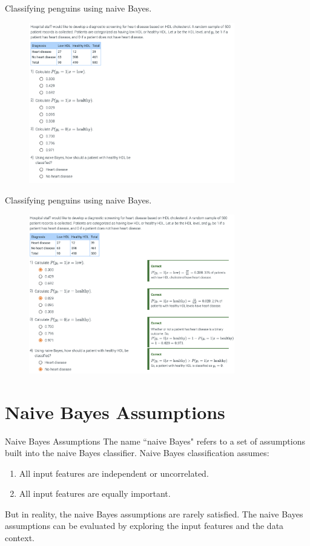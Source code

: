 \documentclass[10pt,dvipsnames]{beamer}
\begin{document}
\begin{frame}{Classifying penguins using naive Bayes.}
	\begin{figure}[ht]
		\centering
		\includegraphics[width=0.8\textwidth]{imgs/nb_14.png}
	\end{figure}
\end{frame}

\begin{frame}{Classifying penguins using naive Bayes.}
	\begin{figure}[ht]
		\centering
		\includegraphics[width=0.8\textwidth]{imgs/nb_15.png}
	\end{figure}
\end{frame}

\section{Naive Bayes Assumptions}
\begin{frame}{Naive Bayes Assumptions}
The name ``naive Bayes" refers to a set of assumptions built into the naive Bayes classifier. Naive Bayes classification assumes:
\begin{enumerate}
	\item All input features are independent or uncorrelated.
	\item All input features are equally important.
\end{enumerate}
But in reality, the naive Bayes assumptions are rarely satisfied. The naive Bayes assumptions can be evaluated by exploring the input features and the data context.
\end{frame}
\end{document}
